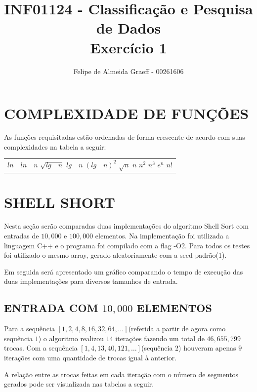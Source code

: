 \documentclass[12pt,twocolumn,a4paper]{article}
\begin{document}
  \title{INF01124 - Classificação e Pesquisa de Dados\\Exercício 1}
  \author{Felipe de Almeida Graeff - 00261606}
  \date{}
  \maketitle
  \section{\textbf{COMPLEXIDADE DE FUNÇÕES}}
    As funções requisitadas estão ordenadas de forma crescente de acordo %
    com suas complexidades na tabela a seguir:

    \begin{table}
      \begin{tabular}{ c }
        $ln \quad ln \quad n$
        $\sqrt{lg \quad n}$
        $lg \quad n$
        $(lg \quad n)^2$
        $\sqrt{n}$
        $n$
        $n^2$
        $n^3$
        $e^n$
        $n!$
      \end{tabular}
    \end{table}

  \section{\textbf{SHELL SHORT}}
    Nesta seção serão comparadas duas implementações do algoritmo Shell Sort
    com entradas de $10,000$ e $100,000$ elementos. Na implementação foi utilizada
    a linguagem C++ e o programa foi compilado com a flag -O2. Para todos os testes
    foi utilizado o mesmo array, gerado aleatoriamente com a seed padrão(1).

    Em seguida será apresentado um gráfico comparando o tempo de execução das
    duas implementações para diversos tamanhos de entrada.

    \subsection{ENTRADA COM $10,000$ ELEMENTOS}
      Para a sequência $[1,2,4,8,16,32,64,\ldots]$(referida a partir de agora
      como sequência $1$) o algoritmo realizou $14$ iterações fazendo um total de
      $46,655,799$ trocas. Com a sequência $[1,4,13,40,121,\ldots]$(sequência $2$)
      houveram apenas $9$ iterações com uma quantidade de trocas igual à anterior.

      A relação entre as trocas feitas em cada iteração com o número de segmentos
      gerados pode ser visualizada nas tabelas a seguir.
\end{document}
